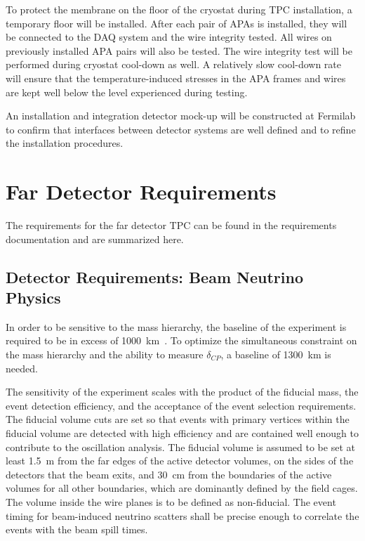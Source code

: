 To protect the membrane on the floor of the cryostat during TPC installation, a temporary floor will be installed. After each pair of APAs is installed, they will be connected to the DAQ system and the wire integrity tested. All wires on previously installed APA pairs will also be tested. The wire integrity test will be performed during cryostat cool-down as well. A relatively slow cool-down rate will ensure that the temperature-induced stresses in the APA frames and wires are kept well below the level experienced during testing. 

An installation and integration detector mock-up will be constructed at Fermilab to confirm that interfaces between detector systems are well defined and to refine the installation procedures. 



\section{Far Detector Requirements}

The requirements for the far detector TPC can be found in the requirements documentation \cite{lar-fd-req} and are summarized here.  

\subsection{Detector Requirements: Beam Neutrino Physics}

In order to be sensitive to the mass hierarchy, the baseline of the
experiment is required to be in excess of
1000~km~\cite{sci-opp,baselineprd}.  To optimize the simultaneous
constraint on the mass hierarchy and the ability to measure
$\delta_{CP}$, a baseline of 1300~km is needed.

The sensitivity of the experiment scales with the product of the
fiducial mass, the event detection efficiency, and the acceptance of
the event selection requirements.  The fiducial volume cuts are set so
that events with primary vertices within the fiducial volume are
detected with high efficiency and are contained well enough to
contribute to the oscillation analysis.  The fiducial volume is
assumed to be set at least 1.5~m from the far edges of the active
detector volumes, on the sides of the detectors that the beam exits,
and 30~cm from the boundaries of the active volumes for all other
boundaries, which are dominantly defined by the field cages.  The
volume inside the wire planes is to be defined as non-fiducial.
The event timing for beam-induced neutrino scatters
shall be precise enough to correlate the events with the
beam spill times.  %

